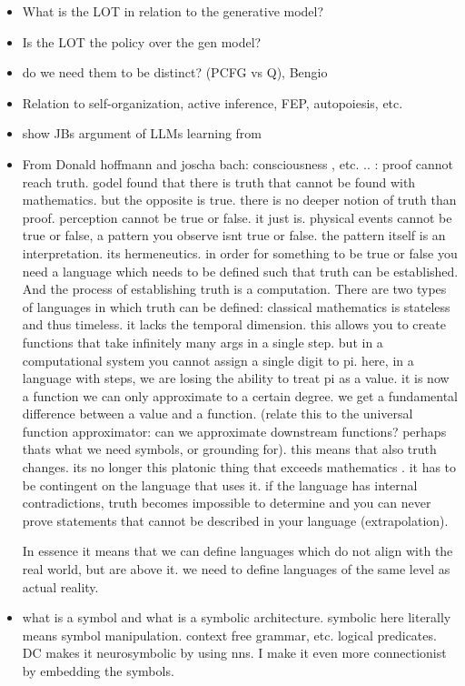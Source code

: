 \begin{itemize}
    \item What is the LOT in relation to the generative model?
    \item Is the LOT the policy over the gen model?
    \item do we need them to be distinct? (PCFG vs Q), Bengio
    \item Relation to self-organization, active inference, FEP, autopoiesis, etc. 
    \item show JBs argument of LLMs learning from 
    \item From Donald hoffmann and joscha bach: consciousness , etc. .. : proof cannot reach truth. godel found that there is truth that cannot be found with mathematics. but the opposite is true. there is no deeper notion of truth than proof. perception cannot be true or false. it just is. physical events cannot be true or false, a pattern you observe isnt true or false. the pattern itself is an interpretation. its hermeneutics. in order for something to be true or false you need a language which needs to be defined such that truth can be established. And the process of establishing truth is a computation. There are two types of languages in which truth can be defined: classical mathematics is stateless and thus timeless. it lacks the temporal dimension. this allows you to create functions that take infinitely many args in a single step. but in a computational system you cannot assign a single digit to pi. here, in a language with steps, we are losing the ability to treat pi as a value. it is now a function we can only approximate to a certain degree. we get a fundamental difference between a value and a function. (relate this to the universal function approximator: can we approximate downstream functions? perhaps thats what we need symbols, or grounding for). this means that also truth changes. its no longer this platonic thing that exceeds mathematics . it has to be contingent on the language that uses it. if the language has internal contradictions, truth becomes impossible to determine and you can never prove statements that cannot be described in your language (extrapolation). 

    In essence it means that we can define languages which do not align with the real world, but are above it. we need to define languages of the same level as actual reality. 
    \item what is a symbol and what is a symbolic architecture. symbolic here literally means symbol manipulation. context free grammar, etc. logical predicates. DC makes it neurosymbolic by using nns. I make it even more connectionist by embedding the symbols. 
\end{itemize}


